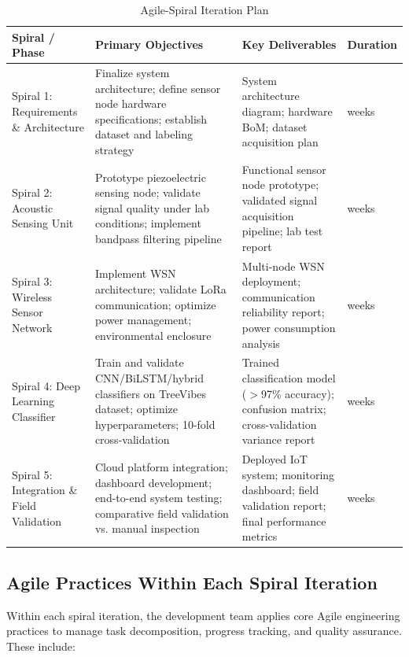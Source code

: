 \documentclass[12pt,a4paper,oneside]{memoir}
\begin{document}
\begin{table}[h!]
\centering
\caption{Agile-Spiral Iteration Plan}
\label{tab:spiral_plan}
\renewcommand{\arraystretch}{1.3}
\begin{tabular}{>{\raggedright\arraybackslash}p{2.2cm} >{\raggedright\arraybackslash}p{3.8cm} >{\raggedright\arraybackslash}p{3.8cm} >{\raggedright\arraybackslash}p{1.8cm}}
\toprule
\textbf{Spiral / Phase} & \textbf{Primary Objectives} & \textbf{Key Deliverables} & \textbf{Duration} \\
\midrule
Spiral 1: Requirements \& Architecture &
Finalize system architecture; define sensor node hardware specifications; establish dataset and labeling strategy &
System architecture diagram; hardware BoM; dataset acquisition plan &
3 weeks \\
Spiral 2: Acoustic Sensing Unit &
Prototype piezoelectric sensing node; validate signal quality under lab conditions; implement bandpass filtering pipeline &
Functional sensor node prototype; validated signal acquisition pipeline; lab test report &
4 weeks \\
Spiral 3: Wireless Sensor Network &
Implement WSN architecture; validate LoRa communication; optimize power management; environmental enclosure &
Multi-node WSN deployment; communication reliability report; power consumption analysis &
4 weeks \\
Spiral 4: Deep Learning Classifier &
Train and validate CNN/BiLSTM/hybrid classifiers on TreeVibes dataset; optimize hyperparameters; 10-fold cross-validation &
Trained classification model ($>$97\% accuracy); confusion matrix; cross-validation variance report &
5 weeks \\
Spiral 5: Integration \& Field Validation &
Cloud platform integration; dashboard development; end-to-end system testing; comparative field validation vs. manual inspection &
Deployed IoT system; monitoring dashboard; field validation report; final performance metrics &
4 weeks \\
\bottomrule
\end{tabular}
\end{table}

\FloatBarrier

\subsection{Agile Practices Within Each Spiral Iteration}

Within each spiral iteration, the development team applies core Agile engineering practices to manage task decomposition, progress tracking, and quality assurance. These include:
\end{document}
